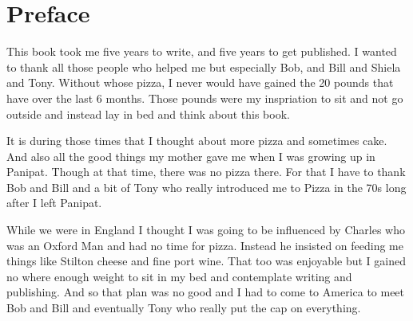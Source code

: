 \chapter{Preface}
{T}{his book took me five years to write}, and five years to get published. I wanted to thank all those people who helped me but especially Bob, and Bill and Shiela and Tony.  Without whose pizza, I never would have gained the 20 pounds that have over the last 6 months.  Those pounds were my inspriation to sit and not go outside and instead lay in bed and think about this book.  

It is during those times that I thought about more pizza and sometimes cake.  And also all the good things my mother gave me when I was growing up in Panipat.  Though at that time, there was no pizza there.  For that I have to thank Bob and Bill and a bit of Tony who really introduced me to Pizza in the 70s long after I left Panipat. 

While we were in England I thought I was going to be influenced by Charles who was an Oxford Man and had no time for pizza. Instead he insisted on feeding me things like Stilton cheese and fine port wine.  That too was enjoyable but I gained no where enough weight to sit in my bed and contemplate writing and publishing. And so that plan was no good and I had to come to America to meet Bob and Bill and eventually Tony who really put the cap on everything. 
\cleardoublepage   %
